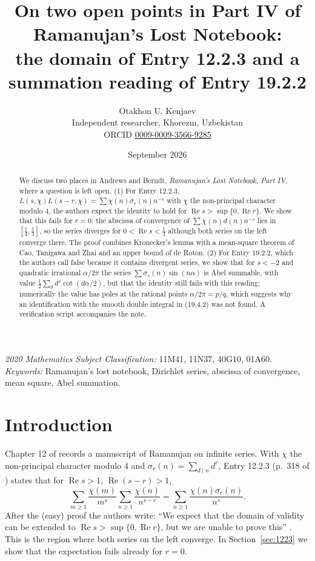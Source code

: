 \documentclass[11pt]{article}
\title{On two open points in Part IV of Ramanujan's Lost Notebook:\\ the domain of Entry 12.2.3 and a summation reading of Entry 19.2.2}
\author{Otakhon U. Kenjaev\\ \small Independent researcher, Khorezm, Uzbekistan\\
\small ORCID \href{https://orcid.org/0009-0009-3566-9285}{0009-0009-3566-9285}}
\date{September 2026}
\theoremstyle{remark}
\begin{document}
\maketitle

\begin{abstract}
We discuss two places in Andrews and Berndt, \emph{Ramanujan's Lost Notebook, Part IV}, where a question is left open.
(1) For Entry 12.2.3, $L(s,\chi)L(s-r,\chi)=\sum\chi(n)\sigma_r(n)n^{-s}$ with $\chi$ the non-principal character modulo $4$,
the authors expect the identity to hold for $\operatorname{Re}s>\sup\{0,\operatorname{Re}r\}$. We show that this fails for $r=0$:
the abscissa of convergence of $\sum\chi(n)d(n)n^{-s}$ lies in $[\tfrac14,\tfrac13]$, so the series diverges for
$0<\operatorname{Re}s<\tfrac14$ although both series on the left converge there. The proof combines Kronecker's lemma with a
mean-square theorem of Cao, Tanigawa and Zhai and an upper bound of de Roton. (2) For Entry 19.2.2, which the authors call false
because it contains divergent series, we show that for $s<-2$ and quadratic irrational $\alpha/2\pi$ the series
$\sum\sigma_s(n)\sin(n\alpha)$ is Abel summable, with value $\frac12\sum_d d^s\cot(d\alpha/2)$, but that the identity still fails
with this reading; numerically the value has poles at the rational points $\alpha/2\pi=p/q$, which suggests why an identification
with the smooth double integral in (19.4.2) was not found. A verification script accompanies the note.
\end{abstract}

\noindent\textit{2020 Mathematics Subject Classification:} 11M41, 11N37, 40G10, 01A60.\\
\textit{Keywords:} Ramanujan's lost notebook, Dirichlet series, abscissa of convergence, mean square, Abel summation.

\section{Introduction}
Chapter 12 of \cite{AB4} records a manuscript of Ramanujan on infinite series. With $\chi$ the non-principal character modulo $4$ and
$\sigma_r(n)=\sum_{d\mid n}d^r$, Entry 12.2.3 (p.~318 of \cite{LN}) states that for $\operatorname{Re}s>1$, $\operatorname{Re}(s-r)>1$,
\begin{equation}\label{eq:1223}
\sum_{m\ge1}\frac{\chi(m)}{m^s}\sum_{n\ge1}\frac{\chi(n)}{n^{s-r}}=\sum_{n\ge1}\frac{\chi(n)\sigma_r(n)}{n^s}.
\end{equation}
After the (easy) proof the authors write: ``We expect that the domain of validity can be extended to
$\operatorname{Re}s>\sup\{0,\operatorname{Re}r\}$, but we are unable to prove this'' \cite[p.~270]{AB4}. This is the region where
both series on the left converge. In Section~\ref{sec:1223} we show that the expectation fails already for $r=0$.
\end{document}
